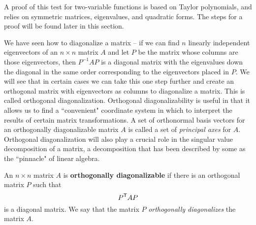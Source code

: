 A proof of this test for two-variable functions is based on Taylor polynomials, and relies on symmetric matrices, eigenvalues, and quadratic forms. The steps for a proof will be found later in this section.



We have seen how to diagonalize a matrix -- if we can find $n$ linearly independent eigenvectors of an $n\times n$ matrix $A$ and let $P$ be the matrix whose columns are those eigenvectors,  then $P^{-1}AP$ is a diagonal matrix with the eigenvalues down the diagonal in the same order corresponding to the eigenvectors placed in $P$. We will see that in certain cases we can take this one step further and create an orthogonal matrix with eigenvectors as columns to diagonalize a matrix. This is called orthogonal diagonalization. Orthogonal diagonalizability is useful in that it allows us to find a ``convenient" coordinate system in which to interpret the results of certain matrix transformations. A set of orthonormal basis vectors for an orthogonally diagonalizable matrix $A$ is called a set of \emph{principal axes} for $A$. Orthogonal diagonalization will also play a crucial role in the singular value decomposition of a matrix, a decomposition that has been described by some as the ``pinnacle" of linear algebra.


\begin{definition} \label{def:7_a_orthogonal _diagonalization} An $n \times n$ matrix $A$ is \textbf{orthogonally diagonalizable} if there is an orthogonal matrix $P$ such that
\[P^{\mathsf{T}}AP\]
is a diagonal matrix. We say that the matrix $P$ \emph{orthogonally diagonalizes} the matrix $A$.
\end{definition}

